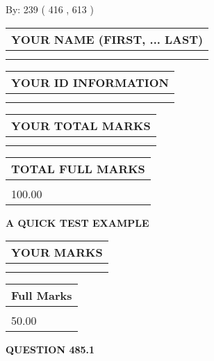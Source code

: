 \documentclass[12pt]{article}
\begin{document}
   
\hspace{1.0in} By: 
 239 ( 416 ,  613 )
   
   
   
   
\newpage 
\setcounter{page}{ 
   485001 } 
   
   
   
   
\noindent\begin{tabular}{|l|}
\hline
YOUR NAME (FIRST, ... LAST)  \\
\hline
 \\ 
 \\ 
\hline
\end{tabular}
\hspace{0.05in} \begin{tabular}{|l|}
\hline
 YOUR   ID   INFORMATION  \\
\hline
 \\ 
 \\ 
\hline
\end{tabular}
   
   
\vspace{0.2in}\noindent\begin{tabular}{|l|}
\hline
YOUR TOTAL MARKS  \\
\hline
 \\ 
 \\ 
\hline
\end{tabular}
\hspace{0.05in} \begin{tabular}{|l|}
\hline
TOTAL FULL MARKS  \\
\hline
 \\ 
100.00 \\
\hline
\end{tabular}
   
   
 \vspace{0.2in}
{\LARGE {\textbf{ A QUICK TEST EXAMPLE}}}
   
   
  
\vspace{0.2in}
  
\noindent\begin{tabular}{|l|}
\hline
 YOUR MARKS  \\
\hline
 \\ 
 \\ 
\hline
\end{tabular}
\hspace{0.05in} \begin{tabular}{|l|}
\hline
 Full Marks  \\
\hline
 \\ 
50.00 \\
\hline
\end{tabular}
{\textbf{\Large{QUESTION
485.1 
}}}
  
\end{document}
